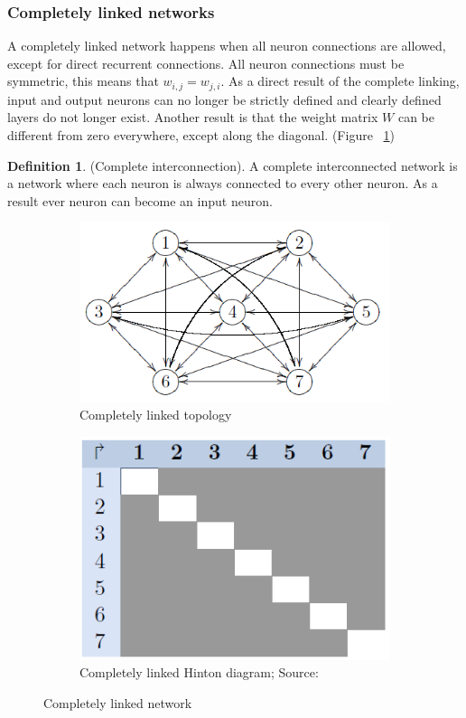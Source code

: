 \documentclass[pdftex,a4paper,12pt,twoside]{report}
\theoremstyle{plain} \newtheorem{theorem}{Theorem} \newtheorem{proposition}{Proposition} \newtheorem{lemma}{Lemma} \newtheorem*{corollary}{Corollary}
\theoremstyle{definition} \newtheorem{definition}{Definition} \newtheorem{conjecture}{Conjecture} \newtheorem*{example}{Example} \newtheorem{algorithm}{Algorithm}
\theoremstyle{remark} \newtheorem*{remark}{Remark} \newtheorem*{note}{Note} \newtheorem{case}{Case}
\begin{document}
\subsubsection{Completely linked networks}
A completely linked network happens when all neuron connections are allowed, except for direct recurrent connections. All neuron connections must be symmetric, this means that $w_{i,j} = w_{j,i}$. As a direct result of the complete linking, input and output neurons can no longer be strictly defined and clearly defined layers do not longer exist. Another result is that the weight matrix $W$ can be different from zero everywhere, except along the diagonal. (Figure ~\ref{fig:completelylinked})
\begin{definition}
(Complete interconnection). A complete interconnected network is a network where each neuron is always connected to every other neuron. As a result ever neuron can become an input neuron.
\end{definition}
\begin{figure}
\centering
	\begin{subfigure}[b]{0.3\textwidth}
	\centering
	\includegraphics[width=\textwidth]{./img/Completelylinked-Topology.png}
	\caption{Completely linked topology}
	\end{subfigure}
	\begin{subfigure}[b]{0.3\textwidth}
	\centering
	\includegraphics[width=\textwidth]{./img/Completelylinked-Hinton.png}
	\caption{Completely linked Hinton diagram; Source:\citep{Kriesel2013}}
	\end{subfigure}
\caption{Completely linked network}
\label{fig:completelylinked}
\end{figure}
\end{document}
